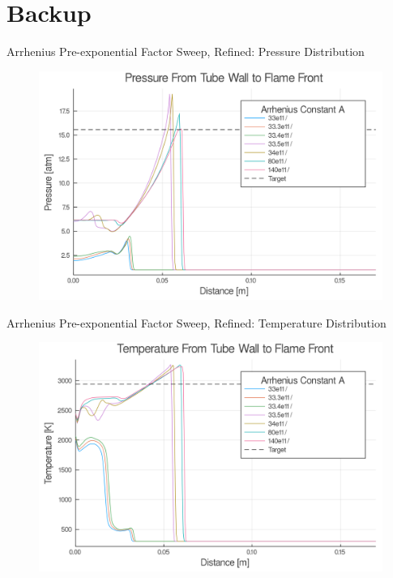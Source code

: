 \section{Backup}

\begin{frame}{Arrhenius Pre-exponential Factor Sweep, Refined: Pressure Distribution}
\begin{figure}
\centering
\includegraphics[width=0.8\linewidth]{../figs/Atest_refined/p.png}
\end{figure}
\end{frame}

\begin{frame}{Arrhenius Pre-exponential Factor Sweep, Refined: Temperature Distribution}
\begin{figure}
\centering
\includegraphics[width=0.8\linewidth]{../figs/Atest_refined/t.png}
\end{figure}

\end{frame}